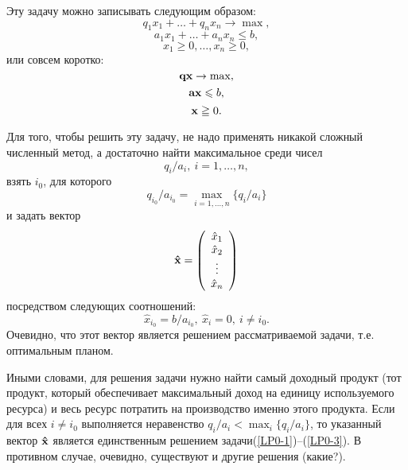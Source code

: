      Эту задачу можно записывать следующим образом:
\begin{equation}
    \label{LP0-1}
    q_{1}x_{1}+\ldots+q_{n}x_{n}\rightarrow\max,
\end{equation}
\begin{equation}
    \label{LP0-2}
    a_{1}x_{1}+\ldots+a_{n}x_{n}\leqslant b,
\end{equation}
\begin{equation}
    \label{LP0-3}
    x_{1}\geqslant0, \ldots, x_{n}\geqslant0,
\end{equation}
    или совсем коротко:
    \[\mathbf{q}\mathbf{x}\rightarrow\max,\] \[ \mathbf{a}\mathbf{x}\leqslant b, \] \[ \mathbf{x}\geqq0.\]


    Для того, чтобы решить эту задачу, не надо применять
    никакой сложный численный метод, а достаточно найти максимальное среди чисел
    \[q_{i}/a_{i}, \ i=1,\ldots,n,\]
    взять $i_{0}$, для которого
    \[q_{i_{0}}/a_{i_{0}}=\max_{i=1,\ldots,n}\{q_{i}/a_{i}\}\]
     и задать вектор
    \[\mathbf{\hat{x}}=\left(
     \begin{array}{c}
        \hat{x}_{1} \\
        \hat{x}_{2} \\
        \vdots \\
        \hat{x}_{n}  \\
      \end{array}
\right)\]
    посредством  следующих соотношений:
\begin{equation}
    \label{LP0-edinstv-resh}
    \hat{x}_{i_{0}}=b/a_{i_{0}},\ \hat{x}_{i}=0,\ i\neq i_{0}.
\end{equation}
        Очевидно, что этот вектор является решением рассматриваемой
        задачи, т.е. оптимальным планом. 

        Иными словами, для решения задачи
    нужно найти самый доходный продукт (тот продукт, который
    обеспечивает максимальный доход на единицу используемого ресурса)
    и весь ресурс потратить на производство именно этого продукта.
    Если для всех $i\neq i_{0}$ выполняется неравенство
    $q_{i}/a_{i}<\max_{i}\{q_{i}/a_{i}\}$, то указанный вектор $\mathbf{\hat{x}}$ является
    единственным решением задачи(\ref{LP0-1})--(\ref{LP0-3}).
    В противном случае, очевидно, существуют и другие решения (какие?).

